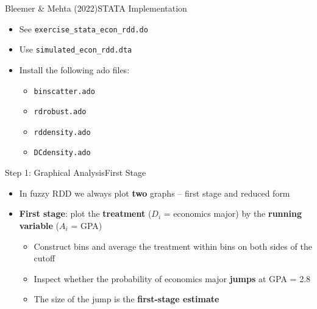 \documentclass[dvipsnames,hyperref={pdfpagelabels=false}]{beamer}
\begin{document}
\begin{frame}{Bleemer \& Mehta (2022)}{STATA Implementation}
	\begin{itemize}
		\item See \texttt{exercise\_stata\_econ\_rdd.do}
		\vspace{0.2cm}
		\item Use \texttt{simulated\_econ\_rdd.dta}
		\vspace{0.2cm}
		\item Install the following ado files:
		\begin{itemize}
			\vspace{0.2cm}
			\item \texttt{binscatter.ado}
			\item \texttt{rdrobust.ado}
			\item \texttt{rddensity.ado}
			\item \texttt{DCdensity.ado}
		\end{itemize}
	\end{itemize}
\end{frame}



\begin{frame}{Step 1: Graphical Analysis}{First Stage}
	\begin{itemize}
		\item In fuzzy RDD we always plot \textbf{two} graphs -- first stage and reduced form
		\vspace{0.2cm}
		\item \textbf{First stage}: plot the \textbf{treatment} ($D_i$ = economics major)
		by the \textbf{running variable} ($A_i$ = GPA)
		\vspace{0.2cm}
		\begin{itemize}
			\item Construct bins and average the treatment within bins on both sides of the cutoff
			\vspace{0.2cm}
			\item Inspect whether the probability of economics major \textbf{jumps} at GPA = 2.8
			\vspace{0.2cm}
			\item The size of the jump is the \textbf{first-stage estimate}
		\end{itemize}
	\end{itemize}
\end{frame}
\end{document}
